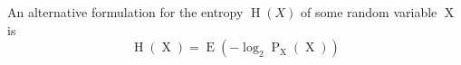 An alternative formulation for the entropy $\operatorname{H}(X)$ of some random variable $\operatorname{X}$ is
$$\operatorname{H}(\operatorname{X}) = \operatorname{E}(- \log_2 \operatorname{P}_{\operatorname{X}}(\operatorname{X}))$$
